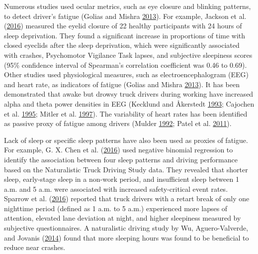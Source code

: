 \documentclass[12pt]{book}
\numberwithin{equation}{chapter}
\begin{document}
Numerous studies used ocular metrics, such as eye closure and blinking patterns, to detect driver's fatigue (Golias and Mishra \protect\hyperlink{ref-golias2013evaluating}{2013}). For example, Jackson et al. (\protect\hyperlink{ref-jackson2016utility}{2016}) measured the eyelid closure of 22 healthy participants with 24 hours of sleep deprivation. They found a significant increase in proportions of time with closed eyeclids after the sleep deprivation, which were significantly associated with crashes, Psychomotor Vigilance Task lapses, and subjective sleepiness scores (95\% confidence interval of Spearman's correlation coefficient was 0.46 to 0.69). Other studies used physiological measures, such as electroencephalogram (EEG) and heart rate, as indicators of fatigue (Golias and Mishra \protect\hyperlink{ref-golias2013evaluating}{2013}). It has been demonstrated that awake but drowsy truck drivers during working have increased alpha and theta power densities in EEG (Kecklund and Åkerstedt \protect\hyperlink{ref-kecklund1993sleepiness}{1993}; Cajochen et al. \protect\hyperlink{ref-cajochen1995power}{1995}; Mitler et al. \protect\hyperlink{ref-mitler1997sleep}{1997}). The variability of heart rates has been identified as passive proxy of fatigue among drivers (Mulder \protect\hyperlink{ref-mulder1992measurement}{1992}; Patel et al. \protect\hyperlink{ref-patel2011applying}{2011}).

Lack of sleep or specific sleep patterns have also been used as proxies of fatigue. For example, G. X. Chen et al. (\protect\hyperlink{ref-chen2016influence}{2016}) used negative binomial regression to identify the association between four sleep patterns and driving performance based on the Naturalistic Truck Driving Study data. They revealed that shorter sleep, early-stage sleep in a non-work period, and insufficient sleep between 1 a.m. and 5 a.m. were associated with increased safety-critical event rates. Sparrow et al. (\protect\hyperlink{ref-sparrow2016naturalistic}{2016}) reported that truck drivers with a retart break of only one nighttime period (defined as 1 a.m. to 5 a.m.) experienced more lapses of attention, elevated lane deviation at night, and higher sleepiness measured by subjective questionnaires. A naturalistic driving study by Wu, Aguero-Valverde, and Jovanis (\protect\hyperlink{ref-wu2014using}{2014}) found that more sleeping hours was found to be beneficial to reduce near crashes.
\end{document}
